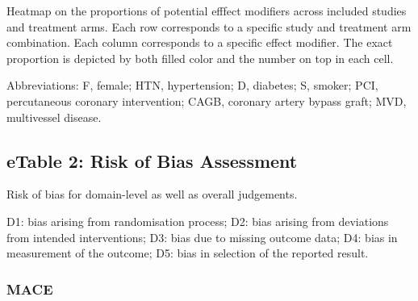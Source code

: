\documentclass[
  12pt,
]{article}
\begin{document}
Heatmap on the proportions of potential efffect modifiers across
included studies and treatment arms. Each row corresponds to a specific
study and treatment arm combination. Each column corresponds to a
specific effect modifier. The exact proportion is depicted by both
filled color and the number on top in each cell.

Abbreviations: F, female; HTN, hypertension; D, diabetes; S, smoker;
PCI, percutaneous coronary intervention; CAGB, coronary artery bypass
graft; MVD, multivessel disease.

\newpage

\hypertarget{etable-2-risk-of-bias-assessment}{%
\subsection{eTable 2: Risk of Bias
Assessment}\label{etable-2-risk-of-bias-assessment}}

Risk of bias for domain-level as well as overall judgements.

D1: bias arising from randomisation process; D2: bias arising from
deviations from intended interventions; D3: bias due to missing outcome
data; D4: bias in measurement of the outcome; D5: bias in selection of
the reported result.

\hypertarget{mace}{%
\subsubsection{MACE}\label{mace}}
\end{document}
